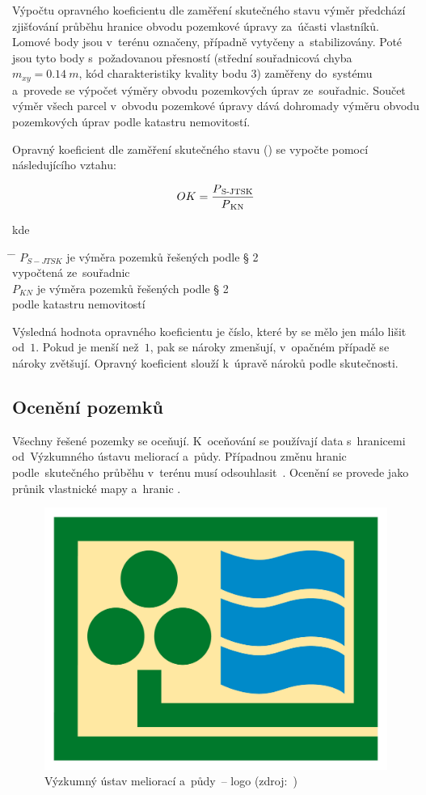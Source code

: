 Výpočtu opravného koeficientu dle zaměření skutečného stavu výměr předchází
zjišťování průběhu hranice obvodu pozemkové úpravy za~účasti vlastníků.
Lomové body jsou v~terénu označeny, případně vytyčeny a~stabilizovány.
Poté jsou tyto body s~požadovanou přesností (střední souřadnicová chyba
$m_{xy}=0.14~m$, kód charakteristiky kvality bodu $3$) zaměřeny
do~systému  a~provede se výpočet výměry obvodu pozemkových
úprav ze~souřadnic. Součet výměr všech parcel v~obvodu pozemkové
úpravy dává dohromady výměru obvodu pozemkových úprav podle katastru
nemovitostí.

Opravný koeficient dle zaměření skutečného stavu () se vypočte pomocí
následujícího vztahu:

\begin{equation} OK =
\frac{P\textsubscript{S-JTSK}}{P\textsubscript{KN}}
\end{equation}

kde
\begin{tabbing} \hspace{2em} \= \hspace{5em} \= \kill \> $P_{S-JTSK}$
\> je výměra pozemků řešených podle § 2 \\ \> \> vypočtená ze~souřadnic \\
\> $P_{KN}$ \> je výměra pozemků řešených podle § 2 \\ \> \> podle
katastru nemovitostí
\end{tabbing}

Výsledná hodnota opravného koeficientu je číslo, které by se mělo jen
málo lišit od~$1$. Pokud je  menší než~$1$, pak se nároky
zmenšují, v~opačném případě se nároky zvětšují. Opravný koeficient
slouží k~úpravě nároků podle skutečnosti.

\subsection{Ocenění pozemků}
\label{oceneni}

Všechny řešené pozemky se oceňují. K~oceňování se používají data
s~hranicemi  od~Výzkumného ústavu meliorací a~půdy. Případnou
změnu hranic  podle~skutečného průběhu v~terénu musí
odsouhlasit~. Ocenění se provede jako průnik vlastnické mapy
a~hranic .

	\begin{figure}[H] \centering
		\includegraphics[width=.5\textwidth]{./pictures/vumop.png}
		\caption[Výzkumný ústav meliorací a~půdy~–
logo]{Výzkumný ústav meliorací a~půdy~– logo (zdroj:~\citep{vumop})}
		\label{fig:vumop}
 	\end{figure}

